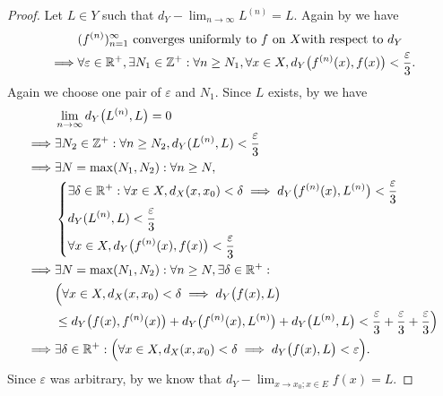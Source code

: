 \begin{proof}
  Let \(L \in Y\) such that \(d_Y - \lim_{n \to \infty} L^{(n)} = L\).
  Again by  we have
  \begin{align*}
             & (f^{(n)})_{n = 1}^\infty \text{ converges uniformly to } f \text{ on } X \text{with respect to } d_Y                                              \\
    \implies & \forall \varepsilon \in \mathbb{R}^+, \exists N_1 \in \mathbb{Z}^+ : \forall n \geq N_1, \forall x \in X, d_Y\big(f^{(n)}(x), f(x)\big) < \dfrac{\varepsilon}{3}.
  \end{align*}
  Again we choose one pair of \(\varepsilon\) and \(N_1\).
  Since \(L\) exists, by  we have
  \begin{align*}
             & \lim_{n \to \infty} d_Y\big(L^{(n)}, L\big) = 0                                                                                                                                 \\
    \implies & \exists N_2 \in \mathbb{Z}^+ : \forall n \geq N_2, d_Y(L^{(n)}, L) < \dfrac{\varepsilon}{3}                                                                                             \\
    \implies & \exists N = \max(N_1, N_2) : \forall n \geq N,                                                                                                                                  \\
             & \begin{dcases}
                 \exists \delta \in \mathbb{R}^+ : \forall x \in X, d_X(x, x_0) < \delta \implies d_Y\big(f^{(n)}(x), L^{(n)}\big) < \dfrac{\varepsilon}{3} \\
                 d_Y(L^{(n)}, L) < \dfrac{\varepsilon}{3}                                                                                           \\
                 \forall x \in X, d_Y\big(f^{(n)}(x), f(x)\big) < \dfrac{\varepsilon}{3}
               \end{dcases}                                              \\
    \implies & \exists N = \max(N_1, N_2) : \forall n \geq N, \exists \delta \in \mathbb{R}^+ :                                                                                                        \\
             & \Big(\forall x \in X, d_X(x, x_0) < \delta \implies d_Y\big(f(x), L\big)                                                                                                        \\
             & \leq d_Y\big(f(x), f^{(n)}(x)\big) + d_Y\big(f^{(n)}(x), L^{(n)}\big) + d_Y\big(L^{(n)}, L\big) < \dfrac{\varepsilon}{3} + \dfrac{\varepsilon}{3} + \dfrac{\varepsilon}{3}\Big) \\
    \implies & \exists \delta \in \mathbb{R}^+ : \Big(\forall x \in X, d_X(x, x_0) < \delta \implies d_Y\big(f(x), L\big) < \varepsilon\Big).
  \end{align*}
  Since \(\varepsilon\) was arbitrary, by  we know that \(d_Y - \lim_{x \to x_0 ; x \in E} f(x) = L\).
\end{proof}

